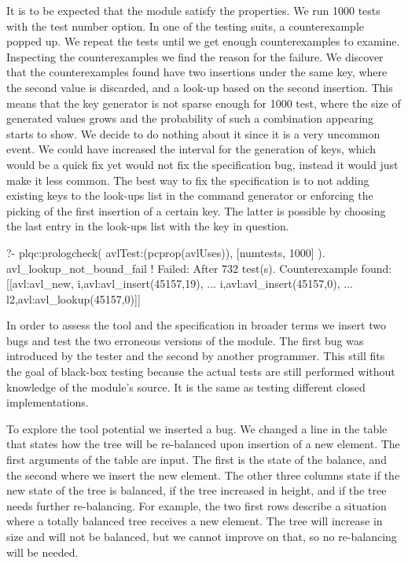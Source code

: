 \documentclass[11pt]{article}
\begin{document}
It is to be expected that the module satisfy the properties.
%
We run 1000 tests with the test number option.
%
In one of the testing suits, a counterexample popped up.
%
We repeat the tests until we get enough counterexamples to examine.
%
Inspecting the counterexamples we find the reason for the failure.
%
We discover that the counterexamples found have two insertions under the
same key, where the second value is discarded, and a look-up based on
the second insertion.
%
This means that the key generator is not sparse enough for 1000 test,
where the size of generated values grows and the probability of such a
combination appearing starts to show.
%
We decide to do nothing about it since it is a very uncommon event.
%
We could have increased the interval for the generation of keys, which
would be a quick fix yet would not fix the specification bug, instead it would just
make it less common.
%
The best way to fix the specification is to not adding existing keys to
the look-ups list in the command generator or enforcing the picking of
the first insertion of a certain key.
%
The latter is possible by choosing the last entry in the look-ups list
with the key in question.
%
\begin{yapcode}
   ?- plqc:prologcheck(
                avlTest:(pcprop(avlUses)),
                [{numtests, 1000}] ).
 avl_lookup_not_bound_fail
 !
 Failed: After 732 test(s).
 Counterexample found: [[avl:avl_new,
     {i,avl:avl_insert(45157,19)}, ...
     {i,avl:avl_insert(45157,0)}, ...
     {l2,avl:avl_lookup(45157,0)}]] 
\end{yapcode}


In order to  assess the tool and the specification in broader terms we
insert two bugs and test the two erroneous versions of the module.
%
The first bug was introduced by the tester and the second by another
programmer.
%
This still fits the goal of black-box testing because the actual tests
are still performed without knowledge of the module's source.
%
It is the same as testing different closed implementations.



To explore the tool potential we inserted a bug.
%
We changed a line in the table that states how the tree will be
re-balanced upon insertion of a new element.
%
The first arguments of the table are input.
%
The first is the state of the balance, and the second where we insert
the new element.
%
The other three columns state if the new state of the tree is balanced,
if the tree increased in height, and if the tree needs further
re-balancing.
%
For example, the two first rows describe a situation where a totally
balanced tree receives a new element.
%
The tree will increase in size and will not be balanced, but we cannot
improve on that, so no re-balancing will be needed.
\end{document}
